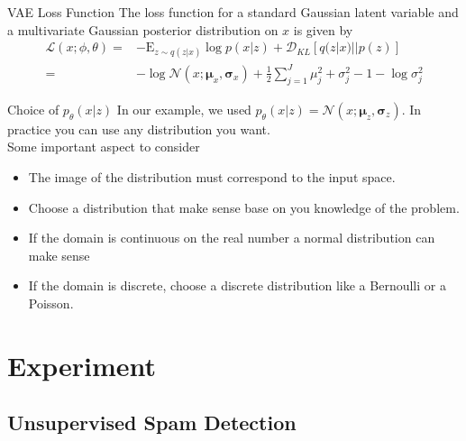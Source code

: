 \documentclass{beamer}
\newcommand{\kldiv}{\mathcal{D}_{KL}}
\newcommand{\E}{\mathrm{E}}
\begin{document}
\begin{frame}[fragile]{VAE Loss Function}
	The loss function for a standard Gaussian latent variable and a multivariate Gaussian posterior distribution on $x$ is given by 
	\begin{equation}
	\begin{split}
			\mathcal{L}(x;\phi, \theta) 
			=& -\E_{z\sim q(z|x)}\log p(x|z) + \kldiv[q(z|x)||p(z)]\\
			=& -\log \mathcal{N}(x;\bm{\mu}_x, \bm{\sigma}_x) + \frac{1}{2}\sum_{j=1}^J \mu_j^2 + \sigma_j^2 - 1 - \log \sigma_j^2
	\end{split}
	\end{equation}
\end{frame}

\begin{frame}{Choice of $p_\theta(x|z)$}
	In our example, we used $p_\theta(x|z)=\mathcal{N}(x;\bm{\mu}_z, \bm{\sigma}_z)$. In practice you can use any distribution you want. \\
	
	Some important aspect to consider
	\begin{itemize}
		\item The image of the distribution must correspond to the input space.\pause
		\item Choose a distribution that make sense base on you knowledge of the problem. \pause
		\item If the domain is continuous on the real number a normal distribution can make sense \pause
		\item If the domain is discrete, choose a discrete distribution like a Bernoulli or a Poisson.
	\end{itemize}
\end{frame}

\section{Experiment}

\subsection{Unsupervised Spam Detection}
\end{document}
